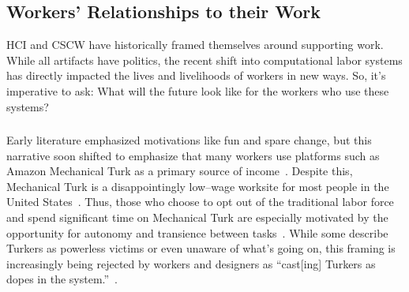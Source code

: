 \documentclass[pn4226]{subfiles}
\begin{document}
\subsection[What will work and the place of work look like for workers]{Workers' Relationships to their Work}\label{sec:relationships}

HCI and CSCW have historically framed themselves around supporting work.
While all artifacts have politics,
the recent shift into computational labor systems has directly impacted
the lives and livelihoods of workers in new ways.
So, it's imperative to ask:
What will the future look like for the workers who use these systems?

\subsubsection{\crowdworkpers}
\begin{comment}
	- Workers do it for money
	- Workers coordinate and communicate (gray, being a turker, team stuff). there is mega--drama
	- Workers don't like requesters. have tried to organize
\end{comment}

Early literature emphasized motivations like fun and spare change, but this narrative soon shifted to emphasize that many workers use platforms such as Amazon Mechanical Turk as a primary source of income~\cite{kaufmann2011more,ipeirotis2010demographics,Antin2012a}.
Despite this, Mechanical Turk is a disappointingly low--wage worksite for most people in the United States~\cite{ipeirotis2010demographics,martin2014being,gupta2014turk}.
Thus, those who choose to opt out of the traditional labor force and spend significant time on Mechanical Turk are especially motivated by the opportunity for autonomy and transience between tasks~\cite{kaufmann2011more}.
While some describe Turkers as powerless victims or even unaware of what's going on,
this framing is increasingly being rejected by workers and designers as
``cast[ing] Turkers as dopes in the system.''~\cite{storiesIraniSilberman}.
\end{document}
